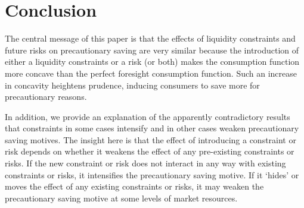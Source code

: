 \documentclass[titlepage]{\econtex}
\begin{document}
  \section{Conclusion}

  The central message of this paper is that the effects of liquidity constraints and future risks on precautionary saving are very similar because the introduction of either a liquidity constraints or a risk (or both) makes the consumption function more concave than the perfect foresight consumption function. Such an increase in concavity heightens prudence, inducing consumers to save more for precautionary reasons. 

  In addition, we provide an explanation of the apparently contradictory results that constraints in some cases intensify and in other cases weaken precautionary saving motives. The insight here is that the effect of introducing a constraint or risk depends on whether it weakens the effect of any pre-existing constraints or risks. If the new constraint or risk does not interact in any way with existing constraints or risks, it intensifies the precautionary saving motive. If it `hides' or moves the effect of any existing constraints or risks, it may weaken the precautionary saving motive at some levels of market resources.

  \clearpage\pagebreak

  

  \vfill\eject
  \appendix
\end{document}
